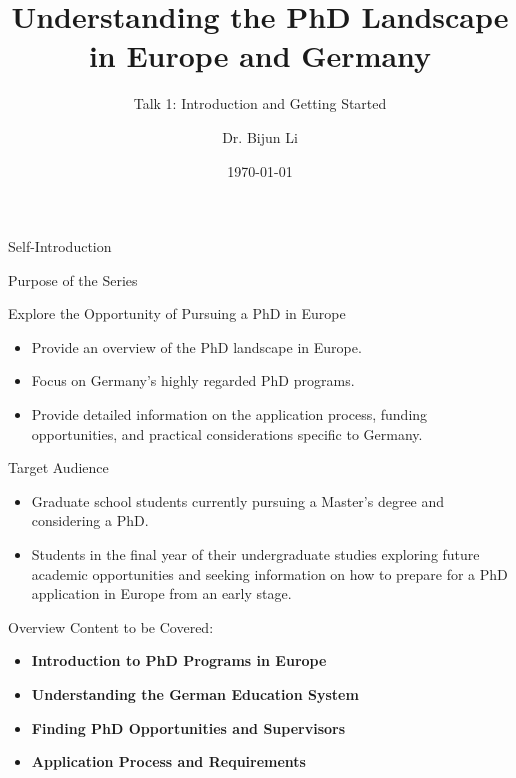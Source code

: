 \documentclass[10pt]{beamer}
\title{Understanding the PhD Landscape in Europe and Germany}
\subtitle{Talk 1: Introduction and Getting Started}
\date{\today}
\author{Dr. Bijun Li}
\begin{document}
\maketitle


\begin{frame}[fragile]{Self-Introduction}


\end{frame}

\begin{frame}[fragile]{Purpose of the Series}

\alert{Explore the Opportunity of Pursuing a PhD in Europe}
\begin{itemize}
	\item Provide an overview of the PhD landscape in Europe.
	\item Focus on Germany's highly regarded PhD programs.
	\item Provide detailed information on the application process, funding opportunities, and practical considerations specific to Germany.
\end{itemize}

\alert{Target Audience}
\begin{itemize}
	\item Graduate school students currently pursuing a Master's degree and considering a PhD.
	\item Students in the final year of their undergraduate studies exploring future academic opportunities and seeking information on how to prepare for a PhD application in Europe from an early stage.
\end{itemize}
  
\end{frame}

\begin{frame}[fragile]{Overview}
\alert{Content to be Covered:}
  \begin{itemize}
    \item \textbf{Introduction to PhD Programs in Europe}
    \item \textbf{Understanding the German Education System}
    \item \textbf{Finding PhD Opportunities and Supervisors}
    \item \textbf{Application Process and Requirements}
  \end{itemize}
\end{frame}
\end{document}
